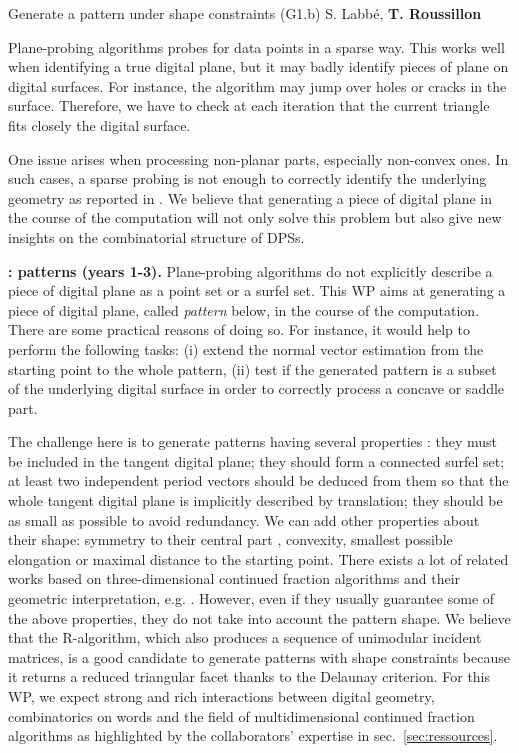    {Generate a pattern under shape constraints (G1.b)}
   {S. Labb\'{e}, \textbf{T. Roussillon}}
\medskip


Plane-probing algorithms probes for data points in a sparse way.
This works well when identifying a true digital plane, but it
may badly identify pieces of plane on digital surfaces. For
instance, the algorithm may jump over holes or cracks in the
surface. Therefore, we have to check at each iteration that the
current triangle fits closely the digital surface.

One issue arises when processing non-planar parts, especially non-convex ones.
In such cases, a sparse probing is not enough to correctly identify the underlying geometry
as reported in \cite{LPRJMIV2017}.
We believe that generating a piece of digital plane in the course of the computation will
not only solve this problem but also give new insights on the combinatorial structure
of DPSs.

\noindent\textbf{\wpPattern: patterns (years 1-3).}
Plane-probing algorithms 
do not explicitly describe a piece of digital plane as a point set or a surfel set.  
This WP aims at generating a piece of digital plane, called \emph{pattern} below, in the course of the computation.%
There are some practical reasons of doing so. For instance, it would help to perform the following tasks: 
(i) extend the normal vector estimation from the starting point to the whole pattern, 
(ii) test if the generated pattern is a subset of the underlying digital surface 
in order to correctly process a concave or saddle part.

The challenge here is to generate patterns having several properties \cite{Jamet2016}: 
they must be included in the tangent digital plane;
they should form a connected surfel set;
at least two independent period vectors should be deduced from them so that the whole tangent digital plane is implicitly described by translation;
they should be as small as possible to avoid redundancy.
We can add other properties about their shape: 
symmetry to their central part \cite{Labbe2015}, convexity, smallest possible elongation 
or maximal distance to the starting point. 
There exists a lot of related works based on three-dimensional continued fraction algorithms and their geometric interpretation, e.g. \cite{Fernique2009,Labbe2011,Jamet2016}. However, even if they usually guarantee some of the above properties, they do not take into account the pattern shape. We believe that the R-algorithm, which also produces a sequence of unimodular incident matrices, is a good candidate to generate patterns with shape constraints because it returns a reduced triangular facet thanks to the Delaunay criterion. For this WP, we expect strong and rich interactions between digital geometry, combinatorics on words and the field of multidimensional continued fraction algorithms as highlighted by the collaborators' expertise in sec.~\ref{sec:ressources}.

